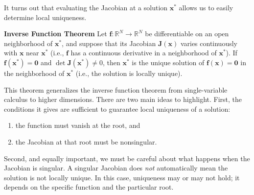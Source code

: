 It turns out that evaluating the Jacobian at a solution $\mathbf x^*$ allows us to easily determine local uniqueness.

\begin{theoremBox}
    \textbf{Inverse Function Theorem}
    Let $\mathbf{f}:\mathbb{R}^N \to \mathbb{R}^N$ be differentiable on an open neighborhood of $\mathbf{x}^*$, and suppose that its Jacobian $\mathbf{J}(\mathbf{x})$ varies continuously with $\mathbf{x}$ near $\mathbf{x}^*$ (i.e., $\mathbf{f}$ has a continuous derivative in a neighborhood of $\mathbf{x}^*$). If $\mathbf{f}(\mathbf{x}^*)=\mathbf{0}$ and $\det \mathbf{J}(\mathbf{x}^*)\neq 0$, then $\mathbf{x}^*$ is the unique solution of $\mathbf{f}(\mathbf{x})=\mathbf{0}$ in the neighborhood of $\mathbf{x}^*$ (i.e., the solution is locally unique).
\end{theoremBox}

This theorem generalizes the inverse function theorem from single-variable calculus to higher dimensions. There are two main ideas to highlight. First, the conditions it gives are sufficient to guarantee local uniqueness of a solution:
\begin{enumerate}
\item the function must vanish at the root, and
\item the Jacobian at that root must be nonsingular.
\end{enumerate}
Second, and equally important, we must be careful about what happens when the Jacobian is singular. A singular Jacobian does \emph{not} automatically mean the solution is not locally unique. In this case, uniqueness may or may not hold; it depends on the specific function and the particular root.

